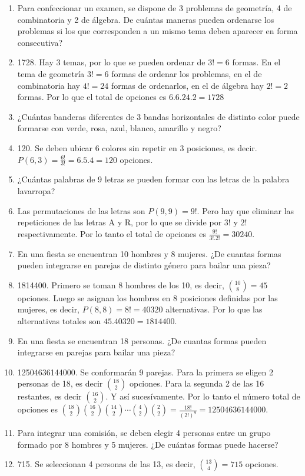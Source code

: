 \documentclass[a4paper]{article}
\newcommand{\answer}{\item[**]}
\begin{document}
\begin{enumerate}
\begin{enumerate} [label=(\alph*)]
		\item Para confeccionar un examen, se dispone de 3 problemas de geometría, 4 de combinatoria y 2 de álgebra. De cuántas maneras pueden ordenarse los problemas si los que corresponden a un mismo tema deben aparecer en forma consecutiva?
		\answer 1728. Hay 3 temas, por lo que se pueden ordenar de $3! = 6$ formas. En el tema de geometría $3! = 6$ formas de ordenar los problemas, en el de combinatoria hay $4!=24$ formas de ordenarlos, en el de álgebra hay $2!=2$ formas. Por lo que el total de opciones es $6.6.24.2 = 1728$

		\item ¿Cuántas banderas diferentes de 3 bandas horizontales de distinto color puede formarse con verde, rosa, azul, blanco, amarillo y negro?
		\answer 120. Se deben ubicar 6 colores sin repetir en 3 posiciones, es decir. $P(6,3)=\frac{6!}{3!}=6.5.4=120$ opciones.

		\item ¿Cuántas palabras de 9 letras se pueden formar con las letras de la palabra lavarropa?
		\answer Las permutaciones de las letras son $P(9,9)=9!$. Pero hay que eliminar las repeticiones de las letras A y R, por lo que se divide por $3!$ y $2!$ respectivamente. Por lo tanto el total de opciones es $\frac{9!}{3!.2!}=30240$.

		\item En una fiesta se encuentran 10 hombres y 8 mujeres. ¿De cuantas formas pueden integrarse en parejas de distinto género para bailar una pieza?
		\answer 1814400. Primero se toman 8 hombres de los 10, es decir, $\binom{10}{8}=45$ opciones. Luego se asignan los hombres en 8 posiciones definidas por las mujeres, es decir, $P(8,8)=8!=40320$ alternativas. Por lo que las alternativas totales son $45.40320=1814400$.

		\item En una fiesta se encuentran 18 personas. ¿De cuantas formas pueden integrarse en parejas para bailar una pieza?
		\answer 12504636144000. Se conformarán 9 parejas. Para la primera se eligen 2 personas de 18, es decir $\binom{18}{2}$ opciones. Para la segunda 2 de las 16 restantes, es decir $\binom{16}{2}$. Y así sucesívamente. Por lo tanto el número total de opciones es $\binom{18}{2}\binom{16}{2}\binom{14}{2} \cdots \binom{4}{2}\binom{2}{2}=\frac{18!}{(2!)^9}=12504636144000$.

		\item Para integrar una comisión, se deben elegir 4 personas entre un grupo formado por 8 hombres y 5 mujeres. ¿De cuántas formas puede hacerse?
		\answer 715. Se seleccionan 4 personas de las 13, es decir, $\binom{13}{4}=715$ opciones.


\end{enumerate}
\end{enumerate}
\end{document}
